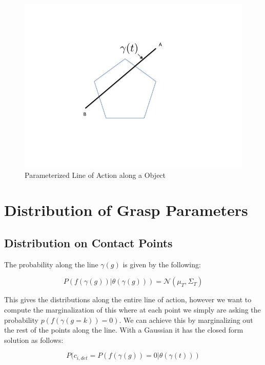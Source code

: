 \documentclass[letterpaper, 10 pt, conference]{ieeeconf}  %
\newcommand{\mN}{\mathcal{N}}
\begin{document}
\begin{figure}[ht!]
\centering
\includegraphics[scale = 0.3]{figures/Slide1.jpg}
\caption{Parameterized Line of Action along a Object}
\vspace*{-10pt}
\label{fig:line_of_action}
\end{figure}


\section{Distribution of Grasp Parameters}


\subsection{Distribution on Contact Points} The probability along the line $\gamma(g)$ is given by the following:

\begin{equation}
P(f(\gamma(g))|\theta(\gamma(g))) 
=
\mN(\mu_T,\Sigma_T)
\end{equation}


This gives the distributions along the entire line of action, however we want to compute the marginalization of this where at each point we simply are asking the probability $p(f(\gamma(g=k))=0)$.
We can achieve this by marginalizing out the rest of the points along the line.
With a Gaussian it has the closed form solution as follows: 

\begin{equation}
P(c_{i,det} =  P(f(\gamma(g))=0|\theta(\gamma(t)))
\end{equation}
\end{document}
